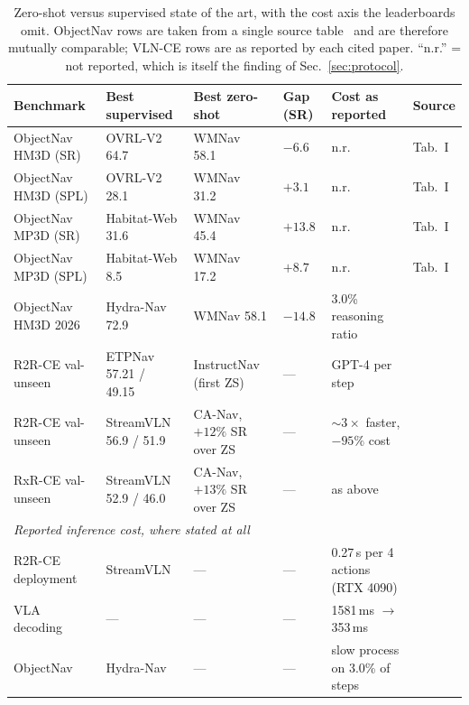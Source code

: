 \documentclass[journal]{IEEEtran}
\begin{document}
\begin{table}[!t]
  \caption{Zero-shot versus supervised state of the art, with the cost axis
  the leaderboards omit. ObjectNav rows are taken from a single
  source table~\cite{nie2025wmnav} and are therefore mutually comparable;
  VLN-CE rows are as reported by each cited paper. ``n.r.'' = not reported,
  which is itself the finding of Sec.~\ref{sec:protocol}.}
  \label{tab:zsvssup}
  \centering
  \setlength{\tabcolsep}{3pt}
  \footnotesize
  \begin{tabular}{llllll}
    \toprule
    Benchmark & Best supervised & Best zero-shot & Gap (SR) & Cost as reported & Source \\
    \midrule
    ObjectNav HM3D (SR)  & OVRL-V2 64.7 & WMNav 58.1~\cite{nie2025wmnav}       & $-6.6$ & n.r. & \cite{nie2025wmnav} Tab.~I \\
    ObjectNav HM3D (SPL) & OVRL-V2 28.1 & WMNav 31.2~\cite{nie2025wmnav}       & $+3.1$ & n.r. & \cite{nie2025wmnav} Tab.~I \\
    ObjectNav MP3D (SR)  & Habitat-Web 31.6 & WMNav 45.4~\cite{nie2025wmnav}   & $+13.8$ & n.r. & \cite{nie2025wmnav} Tab.~I \\
    ObjectNav MP3D (SPL) & Habitat-Web 8.5 & WMNav 17.2~\cite{nie2025wmnav}    & $+8.7$ & n.r. & \cite{nie2025wmnav} Tab.~I \\
    ObjectNav HM3D 2026  & Hydra-Nav 72.9~\cite{wang2026hydra} & WMNav 58.1    & $-14.8$ & 3.0\% reasoning ratio & \cite{wang2026hydra} \\
    \midrule
    R2R-CE val-unseen    & ETPNav 57.21 / 49.15~\cite{an2025etpnav}   & InstructNav (first ZS)~\cite{long2024instructnav} & --- & GPT-4 per step & \cite{long2024instructnav} \\
    R2R-CE val-unseen    & StreamVLN 56.9 / 51.9~\cite{wei2025streamvln} & CA-Nav, $+12\%$ SR over ZS~\cite{chen2025constraint} & --- & $\sim3\times$ faster, $-95\%$ cost & \cite{chen2025constraint} \\
    RxR-CE val-unseen    & StreamVLN 52.9 / 46.0~\cite{wei2025streamvln} & CA-Nav, $+13\%$ SR over ZS~\cite{chen2025constraint} & --- & as above & \cite{chen2025constraint} \\
    \midrule
    \multicolumn{6}{l}{\itshape Reported inference cost, where stated at all} \\
    R2R-CE deployment    & StreamVLN & --- & --- & 0.27\,s per 4 actions (RTX 4090) & \cite{wei2025streamvln} \\
    VLA decoding         & --- & --- & --- & 1581\,ms $\to$ 353\,ms & \cite{feng2026asynchronous} \\
    ObjectNav            & Hydra-Nav & --- & --- & slow process on 3.0\% of steps & \cite{wang2026hydra} \\
    \bottomrule
  \end{tabular}
\end{table}
\end{document}
